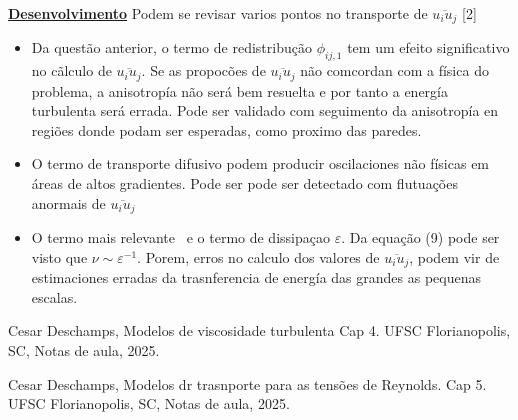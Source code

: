 \documentclass[12pt]{article}
\begin{document}
\textbf{\underline{Desenvolvimento}}
Podem se revisar varios pontos no transporte de $\overline{u_i u_j}$ [2]

\begin{itemize}
	\item Da questão anterior, o termo de redistribução $\phi_{ij,1}$ tem um efeito significativo no cãlculo de $\overline{u_i u_j}$. Se as propocões de $\overline{u_i u_j}$ não comcordan com a física do problema, a anisotropía não será bem resuelta e por tanto a energía turbulenta será errada. Pode ser validado com seguimento da anisotropía en regiões donde podam ser esperadas, como proximo das paredes.
	\item O termo de transporte difusivo podem producir oscilaciones não físicas em áreas de altos gradientes. Pode ser pode ser detectado com flutuações anormais de $\overline{u_i u_j}$
	\item O termo mais relevante ~e o termo de dissipaçao $\varepsilon$. Da equação (9) pode ser visto que $\nu \sim \varepsilon^{-1}$. Porem, erros no calculo dos valores de $\overline{u_i u_j}$, podem vir de estimaciones erradas da trasnferencia de energía das grandes as pequenas escalas.  
\end{itemize}


\begin{thebibliography}{999}
	
	
	Cesar Deschamps,
	Modelos de viscosidade turbulenta Cap 4.
	UFSC Florianopolis, SC,
	Notas de aula,
	2025.
	
	Cesar Deschamps,
	Modelos dr trasnporte para as tensões de Reynolds. Cap 5.
	UFSC Florianopolis, SC,
	Notas de aula,
	2025.
		
	
\end{thebibliography}
\end{document}

